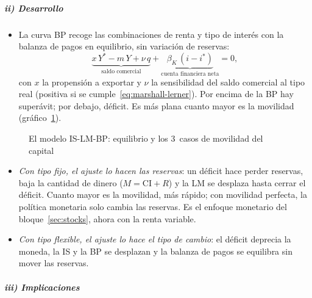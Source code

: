 \documentclass[11pt]{article}
\begin{document}
\subparagraph{ii) Desarrollo}

\begin{itemize}
\item La curva BP recoge las combinaciones de renta y tipo de interés con la balanza de pagos en equilibrio, sin variación de reservas:
  \begin{equation}\label{eq:bp}
  \underbrace{x\,Y^*-m\,Y+\nu\,q}_{\text{saldo comercial}}+\underbrace{\beta_K\,(i-i^*)}_{\text{cuenta financiera neta}}=0 ,
  \end{equation}
  con $x$ la propensión a exportar y $\nu$ la sensibilidad del saldo comercial al tipo real (positiva si se cumple~\eqref{eq:marshall-lerner}). Por encima de la BP hay superávit; por debajo, déficit. Es más plana cuanto mayor es la movilidad (gráfico~\ref{fig:is-lm-bp}).
\end{itemize}

\begin{figure}[H]
\centering
\caption{El modelo IS-LM-BP: equilibrio y los 3~casos de movilidad del capital}\label{fig:is-lm-bp}
\end{figure}

\begin{itemize}
\item \emph{Con tipo fijo, el ajuste lo hacen las reservas}: un déficit hace perder reservas, baja la cantidad de dinero ($M=\mathrm{CI}+R$) y la LM se desplaza hasta cerrar el déficit. Cuanto mayor es la movilidad, más rápido; con movilidad perfecta, la política monetaria solo cambia las reservas. Es el enfoque monetario del bloque~\ref{sec:stocks}, ahora con la renta variable.
\item \emph{Con tipo flexible, el ajuste lo hace el tipo de cambio}: el déficit deprecia la moneda, la IS y la BP se desplazan y la balanza de pagos se equilibra sin mover las reservas.
\end{itemize}

\subparagraph{iii) Implicaciones}
\end{document}
